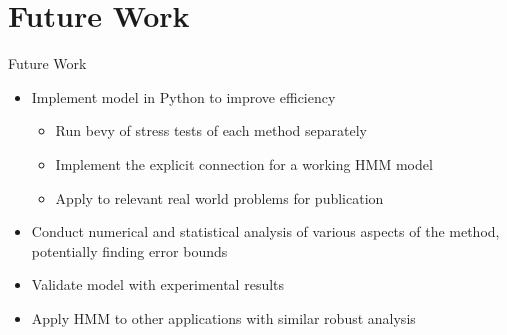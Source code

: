 \documentclass{beamer}
\begin{document}
	\section{Future Work}
	\begin{frame}{Future Work}
		\begin{itemize}
			\item Implement model in Python to improve efficiency
			\begin{itemize}
			\vspace{0.5em}
			\item Run bevy of stress tests of each method separately
			\vspace{0.5em}
			\item Implement the explicit connection for a working HMM model
			\vspace{0.5em}
			\item Apply to relevant real world problems for publication\vspace{0.5em}
			\end{itemize}
			\item Conduct numerical and statistical analysis of various aspects of the method, potentially finding error bounds\vspace{0.5em}
			\item Validate model with experimental results
			\vspace{0.5em}
			\item Apply HMM to other applications with similar robust analysis
		\end{itemize}
	\end{frame}

	

	
	
	
\end{document}
